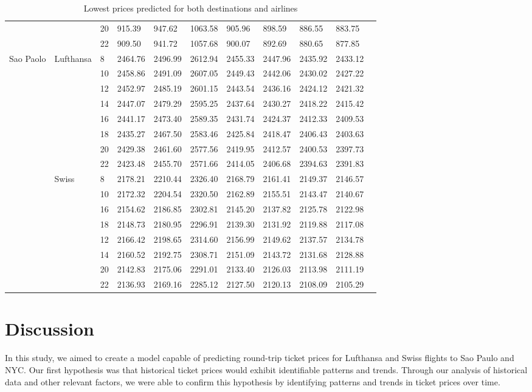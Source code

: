 \begin{table}[h!]
\begin{tabular}{l l l l l l l l l l l}
  & & 20 & 915.39 & 947.62  & 1063.58 & 905.96& 898.59 & 886.55&883.75\\
  & & 22 & 909.50 & 941.72 & 1057.68 & 900.07 & 892.69 &880.65 & 877.85\\
  Sao Paolo & Lufthansa & 8 & 2464.76 & 2496.99 & 2612.94 & 2455.33 & 2447.96 & 2435.92 & 2433.12\\
  & & 10 & 2458.86 & 2491.09 & 2607.05 & 2449.43 & 2442.06 & 2430.02 & 2427.22\\
  & & 12 & 2452.97 & 2485.19 & 2601.15 & 2443.54 & 2436.16 & 2424.12 & 2421.32\\
  & & 14 & 2447.07 & 2479.29 & 2595.25 & 2437.64 & 2430.27 & 2418.22 & 2415.42\\
  & & 16 & 2441.17 & 2473.40 & 2589.35 & 2431.74 & 2424.37 & 2412.33 & 2409.53\\
  & & 18 & 2435.27 & 2467.50 & 2583.46 & 2425.84 & 2418.47 & 2406.43 & 2403.63\\
  & & 20 & 2429.38 & 2461.60 & 2577.56 & 2419.95 & 2412.57 & 2400.53 & 2397.73\\
  & & 22 & 2423.48 & 2455.70 & 2571.66 & 2414.05 & 2406.68 & 2394.63 & 2391.83\\
  & Swiss& 8 & 2178.21 & 2210.44 & 2326.40 & 2168.79 & 2161.41 & 2149.37 & 2146.57\\
  & & 10 & 2172.32 & 2204.54 & 2320.50 & 2162.89 & 2155.51 & 2143.47 & 2140.67\\
  & & 16 & 2154.62 & 2186.85 & 2302.81 & 2145.20 & 2137.82 & 2125.78 & 2122.98\\
  & & 18 & 2148.73 & 2180.95 & 2296.91 & 2139.30 & 2131.92 & 2119.88 & 2117.08\\
  & & 12 & 2166.42 & 2198.65 & 2314.60 & 2156.99 & 2149.62 & 2137.57 & 2134.78\\
  & & 14 & 2160.52 & 2192.75 & 2308.71 & 2151.09 & 2143.72 & 2131.68 & 2128.88\\
  & & 20 & 2142.83 & 2175.06 & 2291.01 & 2133.40 & 2126.03 & 2113.98 & 2111.19\\
  & & 22 & 2136.93 & 2169.16 & 2285.12 & 2127.50 & 2120.13 & 2108.09 & 2105.29\\
  \end{tabular}
  \caption{Lowest prices predicted for both destinations and airlines}
\end{table}

\section{Discussion}
\label{chap:discussion}
In this study, we aimed to create a model capable of predicting round-trip ticket prices for Lufthansa and Swiss flights to Sao Paulo and NYC.
Our first hypothesis was that historical ticket prices would exhibit identifiable patterns and trends.
Through our analysis of historical data and other relevant factors, we were able to confirm this hypothesis by identifying patterns and trends in ticket prices over time.

